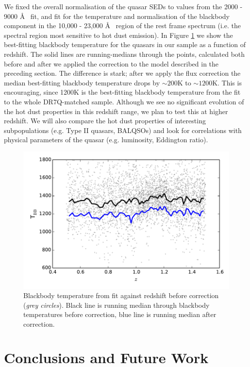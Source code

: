 We fixed the overall normalisation of the quasar SEDs to values from the 2000 - 9000 \AA~ fit, and fit for the temperature and normalisation of the blackbody component in the 10,000 - 23,000 \AA~ region of the rest frame spectrum (i.e. the spectral region most sensitive to hot dust emission). In Figure \ref{fig:bbtvz} we show the best-fitting blackbody temperature for the quasars in our sample as a function of redshift. The solid lines are running-medians through the points, calculated both before and after we applied the correction to the model described in the preceding section. The difference is stark; after we apply the flux correction the median best-fitting blackbody temperature drops by $\sim 200$K to $\sim 1200$K. This is encouraging, since 1200K is the best-fitting blackbody temperature from the fit to the whole DR7Q-matched sample. Although we see no significant evolution of the hot dust properties in this redshift range, we plan to test this at higher redshift. We will also compare the hot dust properties of interesting subpopulations (e.g. Type II quasars, BALQSOs) and look for correlations with physical parameters of the quasar (e.g. luminosity, Eddington ratio). 

\begin{figure}
  \centering
  \includegraphics[width=\textwidth]{figures/chapter06/bbt_z.pdf}
  \caption{Blackbody temperature from fit against redshift before correction ({\it grey circles}). Black line is running median through blackbody temperatures before correction, blue line is running median after correction.}
  \label{fig:bbtvz}
\end{figure}

\newpage

\section{Conclusions and Future Work}

